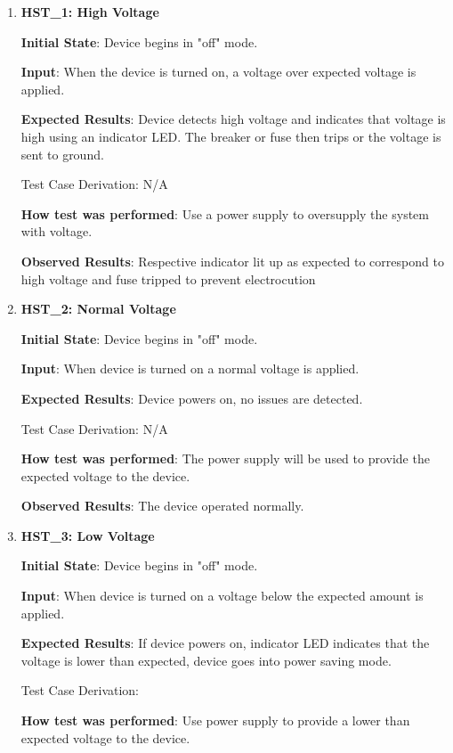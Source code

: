 \documentclass[12pt, titlepage]{article}
\begin{document}
\begin{enumerate}

  \item{\textbf{HST\_1: High Voltage}}\label{HST1}

  \textbf{Initial State}: Device begins in "off" mode.

  \textbf{Input}: When the device is turned on, a voltage over expected voltage is applied.

  \textbf{Expected Results}: Device detects high voltage and indicates that voltage is high using an indicator LED. The breaker or fuse then trips or the voltage is sent to ground.

  Test Case Derivation: N/A

  \textbf{How test was performed}: Use a power supply to oversupply the system with voltage.

  \textbf{Observed Results}: Respective indicator lit up as expected to correspond to high voltage and fuse tripped to prevent electrocution

  \item{\textbf{HST\_2: Normal Voltage}}\label{HST2}

  \textbf{Initial State}: Device begins in "off" mode.

  \textbf{Input}: When device is turned on a normal voltage is applied.

  \textbf{Expected Results}: Device powers on, no issues are detected.

  Test Case Derivation: N/A

  \textbf{How test was performed}: The power supply will be used to provide the expected voltage to the device.

  \textbf{Observed Results}: The device operated normally.

  \item{\textbf{HST\_3: Low Voltage}}\label{HST3}

  \textbf{Initial State}: Device begins in "off" mode.

  \textbf{Input}: When device is turned on a voltage below the expected amount is applied.

  \textbf{Expected Results}: If device powers on, indicator LED indicates that the voltage is lower than expected, device goes into power saving mode.

  Test Case Derivation:

  \textbf{How test was performed}: Use power supply to provide a lower than expected voltage to the device.


\end{enumerate}
\end{document}
